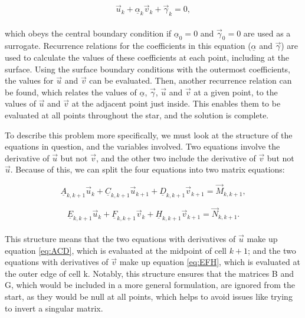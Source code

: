 \documentclass[11pt]{amsart}
\begin{document}
\begin{equation} \label{eq:relation}
\vec{u}_{k}  + \underline{\alpha}_{k}  \vec{v}_{k}  + \vec{\gamma}_{k}  = 0,
\end{equation}
\\
which obeys the central boundary condition if $\underline{\alpha}_{0} = 0$ and $\vec{\gamma}_{0} = 0$ are used as a surrogate.  Recurrence relations for the coefficients in this equation ($\underline{\alpha}$ and $\vec{\gamma}$) are used to calculate the values of these coefficients at each point, including at the surface.  Using the surface boundary conditions with the outermost coefficients, the values for $\vec{u}$ and $\vec{v}$ can be evaluated.  Then, another recurrence relation can be found, which relates the values of $\underline{\alpha}$, $\vec{\gamma}$, $\vec{u}$ and $\vec{v}$ at a given point, to the values of $\vec{u}$ and $\vec{v}$ at the adjacent point just inside.  This enables them to be evaluated at all points throughout the star, and the solution is complete.

To describe this problem more specifically, we must look at the structure of the equations in question, and the variables involved.  Two equations involve the derivative of $\vec{u}$ but not $\vec{v}$, and the other two include the derivative of $\vec{v}$ but not $\vec{u}$.  Because of this, we can split the four equations into two matrix equations:

\begin{equation} \label{eq:ACD}
\underline{A}_{k,k+1} \vec{u}_{k} + \underline{C}_{k,k+1} \vec{u}_{k+1} + \underline{D}_{k,k+1} \vec{v}_{k+1} = \vec{M}_{k,k+1},
\end{equation} 

\begin{equation} \label{eq:EFH}
\underline{E}_{k,k+1} \vec{u}_{k} + \underline{F}_{k,k+1} \vec{v}_{k} + \underline{H}_{k,k+1} \vec{v}_{k+1} = \vec{N}_{k,k+1}.
\end{equation} 
\\

This structure means that the two equations with derivatives of $\vec{u}$ make up equation \ref{eq:ACD}, which is evaluated at the midpoint of cell $k+1$; and the two equations with derivatives of $\vec{v}$ make up equation \ref{eq:EFH}, which is evaluated at the outer edge of cell k.  Notably, this structure ensures that the matrices B and G, which would be included in a more general formulation, are ignored from the start, as they would be null at all points, which helps to avoid issues like trying to invert a singular matrix.
\end{document}
